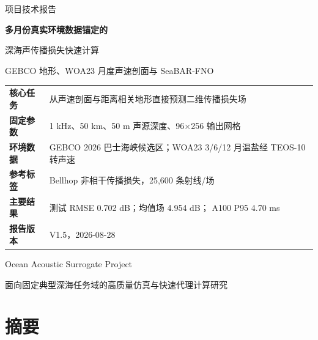 \documentclass[UTF8,11pt]{ctexart}
\newcommand{\BestRMSE}{0.702}
\newcommand{\GlobalBaseline}{4.954}
\newcommand{\GpuPninetyfive}{4.70}
\begin{document}
\begin{titlepage}
\vspace*{2.0cm}
{\sffamily\color{Blue}\Large 项目技术报告}\par
\vspace{0.75cm}
{\sffamily\bfseries\color{Navy}\fontsize{26}{34}\selectfont
多月份真实环境数据锚定的\par
深海声传播损失快速计算}\par
\vspace{0.65cm}
{\sffamily\color{Dark}\Large
GEBCO 地形、WOA23 月度声速剖面与 SeaBAR-FNO}\par

\vspace{1.45cm}
\begin{summarybox}
\centering
\begin{tabular}{L{3.4cm}L{8.0cm}}
\textbf{核心任务} & 从声速剖面与距离相关地形直接预测二维传播损失场 \\
\textbf{固定参数} & 1 kHz、50 km、50 m 声源深度、96$\times$256 输出网格 \\
\textbf{环境数据} & GEBCO 2026 巴士海峡候选区；WOA23 3/6/12 月温盐经 TEOS-10 转声速 \\
\textbf{参考标签} & Bellhop 非相干传播损失，25,600 条射线/场 \\
\textbf{主要结果} & 测试 RMSE \BestRMSE{} dB；均值场 \GlobalBaseline{} dB；
  A100 P95 \GpuPninetyfive{} ms \\
\textbf{报告版本} & V1.5，2026-08-28 \\
\end{tabular}
\end{summarybox}
\vfill
{\sffamily\color{Navy}\Large Ocean Acoustic Surrogate Project}\par
\vspace{0.3cm}
{\color{Dark}面向固定典型深海任务域的高质量仿真与快速代理计算研究}\par
\vspace{1.0cm}
\end{titlepage}

\section*{摘\quad 要}
\end{document}
